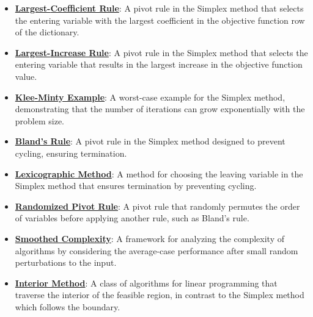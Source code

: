 \documentclass{article}%
\begin{document}
\begin{itemize}[leftmargin=*]%
\item \href{https://www.math.purdue.edu/~yipn/421/2024-09-05-SimplexEfficiency.pdf#page=4}{\textbf{Largest{-}Coefficient Rule}}: A pivot rule in the Simplex method that selects the entering variable with the largest coefficient in the objective function row of the dictionary.%
\item \href{https://www.math.purdue.edu/~yipn/421/2024-09-05-SimplexEfficiency.pdf#page=6}{\textbf{Largest{-}Increase Rule}}: A pivot rule in the Simplex method that selects the entering variable that results in the largest increase in the objective function value.%
\item \href{https://www.math.purdue.edu/~yipn/421/2024-09-05-SimplexEfficiency.pdf#page=2}{\textbf{Klee{-}Minty Example}}: A worst-case example for the Simplex method, demonstrating that the number of iterations can grow exponentially with the problem size.%
\item \href{https://www.math.purdue.edu/~yipn/421/2024-09-05-SimplexEfficiency.pdf#page=10}{\textbf{Bland's Rule}}: A pivot rule in the Simplex method designed to prevent cycling, ensuring termination.%
\item \href{https://www.math.purdue.edu/~yipn/421/2024-09-05-SimplexEfficiency.pdf#page=10}{\textbf{Lexicographic Method}}: A method for choosing the leaving variable in the Simplex method that ensures termination by preventing cycling.%
\item \href{https://www.math.purdue.edu/~yipn/421/2024-09-05-SimplexEfficiency.pdf#page=10}{\textbf{Randomized Pivot Rule}}: A pivot rule that randomly permutes the order of variables before applying another rule, such as Bland's rule.%
\item \href{https://www.math.purdue.edu/~yipn/421/2024-09-05-SimplexEfficiency.pdf#page=11}{\textbf{Smoothed Complexity}}: A framework for analyzing the complexity of algorithms by considering the average-case performance after small random perturbations to the input.%
\item \href{https://www.math.purdue.edu/~yipn/421/2024-09-05-SimplexEfficiency.pdf#page=12}{\textbf{Interior Method}}: A class of algorithms for linear programming that traverse the interior of the feasible region, in contrast to the Simplex method which follows the boundary.%
\end{itemize}%
\end{document}

